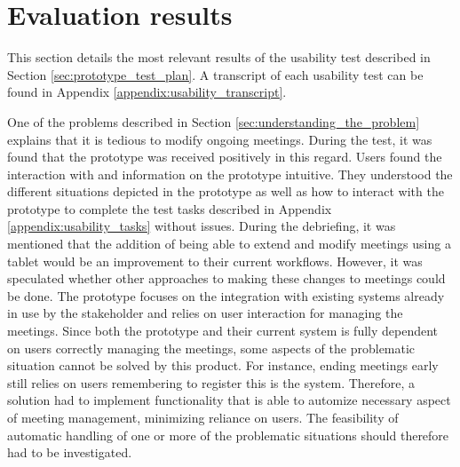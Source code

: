 \section{Evaluation results}\label{sec:usability_evaluation_results}
This section details the most relevant results of the usability test described in Section \ref{sec:prototype_test_plan}.
A transcript of each usability test can be found in Appendix \ref{appendix:usability_transcript}.

One of the problems described in Section \ref{sec:understanding_the_problem} explains that it is tedious to modify ongoing meetings. 
During the test, it was found that the prototype was received positively in this regard. 
Users found the interaction with and information on the prototype intuitive. 
They understood the different situations depicted in the prototype as well as how to interact with the prototype to complete the test tasks described in Appendix \ref{appendix:usability_tasks} without issues.
During the debriefing, it was mentioned that the addition of being able to extend and modify meetings using a tablet would be an improvement to their current workflows.
However, it was speculated whether other approaches to making these changes to meetings could be done. 
The prototype focuses on the integration with existing systems already in use by the stakeholder and relies on user interaction for managing the meetings.
Since both the prototype and their current system is fully dependent on users correctly managing the meetings, some aspects of the problematic situation cannot be solved by this product. 
For instance, ending meetings early still relies on users remembering to register this is the system. 
Therefore, a solution had to implement functionality that is able to automize necessary aspect of meeting management, minimizing reliance on users.
The feasibility of  automatic handling of one or more of the problematic situations should therefore had to be investigated.